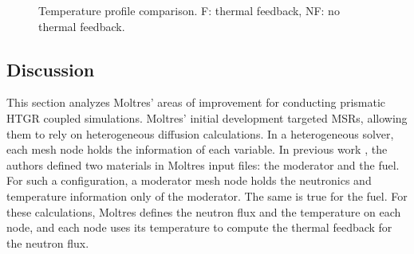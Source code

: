 \begin{figure}[htbp!]
  \centering
  \hfill
  \caption{Temperature profile comparison. F: thermal feedback, NF: no thermal feedback.}
  \label{fig:coupled-results-th}
\end{figure}

\subsection{Discussion}
\label{sec:discuss}

This section analyzes Moltres' areas of improvement for conducting prismatic HTGR coupled simulations.
Moltres' initial development targeted MSRs, allowing them to rely on heterogeneous diffusion calculations.
In a heterogeneous solver, each mesh node holds the information of each variable.
In previous work \cite{lindsay_introduction_2018}\cite{pater_multiphysics_2019}, the authors defined two materials in Moltres input files: the moderator and the fuel.
For such a configuration, a moderator mesh node holds the neutronics and temperature information only of the moderator.
The same is true for the fuel.
For these calculations, Moltres defines the neutron flux and the temperature on each node, and each node uses its temperature to compute the thermal feedback for the neutron flux.

